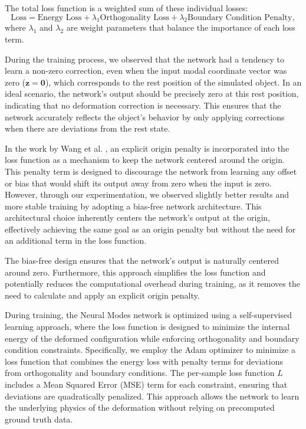 The total loss function is a weighted sum of these individual losses:
\begin{equation}
    \text{Loss} = \text{Energy Loss} + \lambda_1 \text{Orthogonality Loss} + \lambda_2 \text{Boundary Condition Penalty},
\end{equation}
where $\lambda_1$ and $\lambda_2$ are weight parameters that balance the importance of each loss term.

During the training process, we observed that the network had a tendency to learn a non-zero correction, even when the input modal coordinate vector was zero (\(\bm{z} = \bm{0}\)), which corresponds to the rest position of the simulated object. In an ideal scenario, the network's output should be precisely zero at this rest position, indicating that no deformation correction is necessary. This ensures that the network accurately reflects the object's behavior by only applying corrections when there are deviations from the rest state.

In the work by Wang et al. \cite{Wang_Du_Coros_Thomaszewski_2024}, an explicit origin penalty is incorporated into the loss function as a mechanism to keep the network centered around the origin. This penalty term is designed to discourage the network from learning any offset or bias that would shift its output away from zero when the input is zero. However, through our experimentation, we observed slightly better results and more stable training by adopting a bias-free network architecture. This architectural choice inherently centers the network's output at the origin, effectively achieving the same goal as an origin penalty but without the need for an additional term in the loss function.

The bias-free design ensures that the network's output is naturally centered around zero. Furthermore, this approach simplifies the loss function and potentially reduces the computational overhead during training, as it removes the need to calculate and apply an explicit origin penalty. 

During training, the Neural Modes network is optimized using a self-supervised learning approach, where the loss function is designed to minimize the internal energy of the deformed configuration while enforcing orthogonality and boundary condition constraints. Specifically, we employ the Adam optimizer to minimize a loss function that combines the energy loss with penalty terms for deviations from orthogonality and boundary conditions. The per-sample loss function \( L \) includes a Mean Squared Error (MSE) term for each constraint, ensuring that deviations are quadratically penalized. This approach allows the network to learn the underlying physics of the deformation without relying on precomputed ground truth data.


